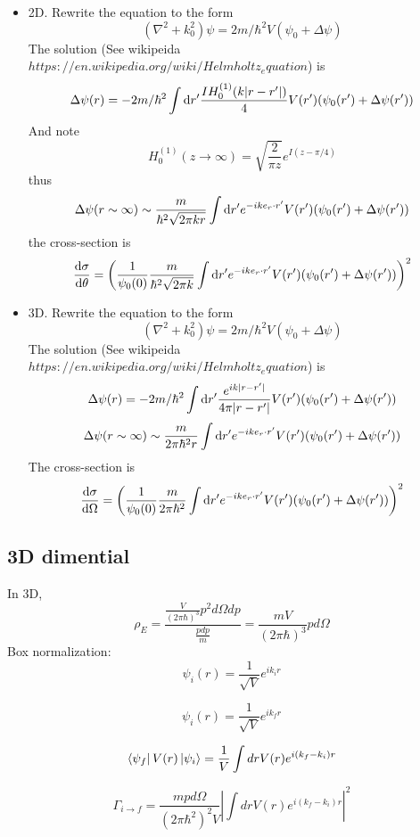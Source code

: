 \documentclass[12pt,twoside]{article}
\def\df{{\rm d}}
\begin{document}
\begin{itemize}
  \item 2D.
  Rewrite the equation to the form
  $$
  (\nabla^2 + k_0^2) \psi = 2m/\hbar^2 V (\psi_0+\Delta\psi)
  $$
  The solution (See wikipeida $https://en.wikipedia.org/wiki/Helmholtz_equation$) is
  $$
\Delta\psi(r) =-2m/\hbar^2 \int \df r^\prime  \frac{I H_0^{(1)}(k |r -r^\prime|)}{4} V(r^\prime) (\psi_0(r^\prime)+\Delta\psi(r^\prime))
  $$
  And note
  $$
  H_0^{(1)}(z\rightarrow\infty) = \sqrt{\frac{2}{\pi z}} e^{I (z - \pi/4)}
  $$
  thus
  $$
  \Delta\psi(r\sim\infty) \sim \frac{m}{\hbar^2 \sqrt{2\pi k r}} \int \df r^\prime e^{-i k e_r \cdot r^\prime} V(r^\prime) (\psi_0(r^\prime)+\Delta\psi(r^\prime))
  $$
  the cross-section is
  $$
  \frac{\df \sigma}{\df \theta} = \left(\frac{1}{\psi_0(0)}\frac{m}{\hbar^2 \sqrt{2\pi k}} \int \df r^\prime e^{-i k e_r \cdot r^\prime} V(r^\prime) (\psi_0(r^\prime)+\Delta\psi(r^\prime))\right)^2
  $$
  \item 3D.
  Rewrite the equation to the form
  $$
  (\nabla^2 + k_0^2) \psi = 2m/\hbar^2 V (\psi_0+\Delta\psi)
  $$
  The solution (See wikipeida $https://en.wikipedia.org/wiki/Helmholtz_equation$) is
  $$
\Delta\psi(r) =-2m/\hbar^2 \int \df r^\prime  \frac{e^{i k |r-r^\prime|}}{4\pi |r -r^\prime|} V(r^\prime) (\psi_0(r^\prime)+\Delta\psi(r^\prime))
  $$
    $$
\Delta\psi(r\sim\infty) \sim \frac{m}{2\pi\hbar^2 r} \int \df r^\prime e^{-i k e_r \cdot r^\prime} V(r^\prime) (\psi_0(r^\prime)+\Delta\psi(r^\prime))
  $$
  The cross-section is
  $$
  \frac{\df\sigma}{\df\Omega} = \left(\frac{1}{\psi_0(0)}\frac{m}{2\pi\hbar^2} \int \df r^\prime e^{-i k e_r \cdot r^\prime} V(r^\prime) (\psi_0(r^\prime)+\Delta\psi(r^\prime))\right)^2
  $$

\end{itemize}

\subsection{3D dimential}

In 3D,
$$
\rho_E = \frac{
\frac{V}{(2\pi\hbar)^3}{ p^2 d\Omega dp}
}{
\frac{p dp}{m}
}
=
\frac{m V}{(2\pi\hbar)^3}{ p d\Omega}
$$
Box normalization:
$$
\psi_i(r) = \frac{1}{\sqrt{V}} e^{i k_i r}
$$

$$
\psi_i(r) = \frac{1}{\sqrt{V}} e^{i k_f r}
$$

$$
\bra{\psi_f} V(r) \ket{\psi_i} =  \frac{1}{V} \int dr V(r) e^{i(k_f - k_i) r}
$$

$$
\Gamma_{i\rightarrow f} = \frac{mp d\Omega}{(2\pi \hbar^2)^2 V} |\int dr V(r) e^{i(k_f - k_i) r}|^2
$$
\end{document}
